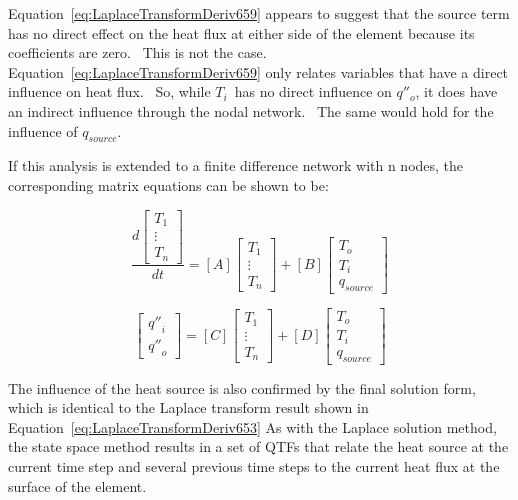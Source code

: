 Equation~\ref{eq:LaplaceTransformDeriv659} appears to suggest that the source term has no direct effect on the heat flux at either side of the element because its coefficients are zero.~ This is not the case.~ Equation~\ref{eq:LaplaceTransformDeriv659} only relates variables that have a direct influence on heat flux.~ So, while \(T_i\)~has no direct influence on \({q''_o}\), it does have an indirect influence through the nodal network.~ The same would hold for the influence of \(q_{source}\).

If this analysis is extended to a finite difference network with n nodes, the corresponding matrix equations can be shown to be:

\begin{equation}
\frac{{d\left[ {\begin{array}{ccc}{{T_1}}\\ \vdots \\ {{T_n}}\end{array}} \right]}}{{dt}} = \left[ A \right]\left[ {\begin{array}{ccc}{{T_1}}\\ \vdots \\ {{T_n}}\end{array}} \right] + \left[ B \right]\left[ {\begin{array}{ccc}{{T_o}}\\ {{T_i}}\\ {{q_{source}}}\end{array}} \right]
\end{equation}

\begin{equation}
\left[ {\begin{array}{ccc}{{{q''}_i}}\\ {{{q''}_o}}\end{array}} \right] = \left[ C \right]\left[ {\begin{array}{ccc}{{T_1}}\\ \vdots \\ {{T_n}}\end{array}} \right] + \left[ D \right]\left[ {\begin{array}{ccc}{{T_o}}\\ {{T_i}}\\ {{q_{source}}}\end{array}} \right]
\end{equation}

The influence of the heat source is also confirmed by the final solution form, which is identical to the Laplace transform result shown in Equation~\ref{eq:LaplaceTransformDeriv653} As with the Laplace solution method, the state space method results in a set of QTFs that relate the heat source at the current time step and several previous time steps to the current heat flux at the surface of the element.

